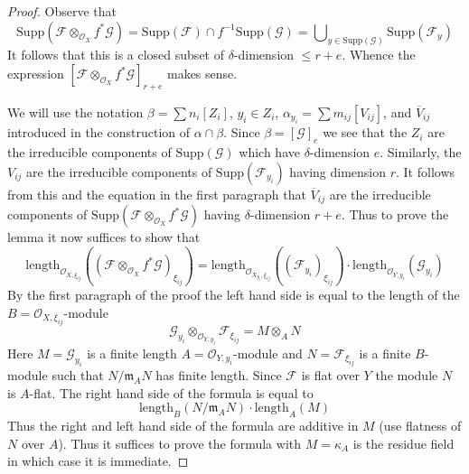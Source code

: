 \documentclass{stacks-project}
\theoremstyle{plain}
\theoremstyle{definition}
\theoremstyle{remark}
\numberwithin{equation}{subsection}
\begin{document}
\begin{proof}
Observe that
$$
\text{Supp}(\mathcal{F} \otimes_{\mathcal{O}_X} f^*\mathcal{G}) =
\text{Supp}(\mathcal{F}) \cap f^{-1}\text{Supp}(\mathcal{G}) =
\bigcup\nolimits_{y \in \text{Supp}(\mathcal{G})} \text{Supp}(\mathcal{F}_y)
$$
It follows that this is a closed subset of $\delta$-dimension $\leq r + e$.
Whence the expression
$[\mathcal{F} \otimes_{\mathcal{O}_X} f^*\mathcal{G}]_{r + e}$
makes sense.

\medskip\noindent
We will use the notation
$\beta = \sum n_i[Z_i]$, $y_i \in Z_i$,
$\alpha_{y_i} = \sum m_{ij} [V_{ij}]$, and
$\overline{V}_{ij}$ introduced in the construction
of $\alpha \cap \beta$. Since $\beta = [\mathcal{G}]_e$
we see that the $Z_i$ are the irreducible components of
$\text{Supp}(\mathcal{G})$ which have $\delta$-dimension $e$.
Similarly, the $V_{ij}$ are the irreducible components
of $\text{Supp}(\mathcal{F}_{y_i})$ having dimension $r$.
It follows from this and the equation in the first
paragraph that $\overline{V}_{ij}$ are the irreducible
components of
$\text{Supp}(\mathcal{F} \otimes_{\mathcal{O}_X} f^*\mathcal{G})$
having $\delta$-dimension $r + e$.
Thus to prove the lemma it now suffices to show that
$$
\text{length}_{\mathcal{O}_{X, \xi_{ij}}}(
(\mathcal{F} \otimes_{\mathcal{O}_X} f^*\mathcal{G})_{\xi_{ij}})
=
\text{length}_{\mathcal{O}_{X_{y_i}, \xi_{ij}}}((\mathcal{F}_{y_i})_{\xi_{ij}})
\cdot
\text{length}_{\mathcal{O}_{Y, y_i}}(\mathcal{G}_{y_i})
$$
By the first paragraph of the proof the left hand side is equal to
the length of the $B = \mathcal{O}_{X, \xi_{ij}}$-module
$$
\mathcal{G}_{y_i}
\otimes_{\mathcal{O}_{Y, y_i}}
\mathcal{F}_{\xi_{ij}} =
M \otimes_A N
$$
Here $M = \mathcal{G}_{y_i}$ is a finite length
$A = \mathcal{O}_{Y, y_i}$-module and $N = \mathcal{F}_{\xi_{ij}}$
is a finite $B$-module such that $N/\mathfrak m_AN$ has finite length.
Since $\mathcal{F}$ is flat over $Y$ the module $N$ is $A$-flat.
The right hand side of the formula is equal to
$$
\text{length}_B(N/\mathfrak m_A N) \cdot \text{length}_A(M)
$$
Thus the right and left hand side of the formula are additive in $M$
(use flatness of $N$ over $A$). Thus it suffices to prove the
formula with $M = \kappa_A$ is the residue field in which
case it is immediate.
\end{proof}
\end{document}

